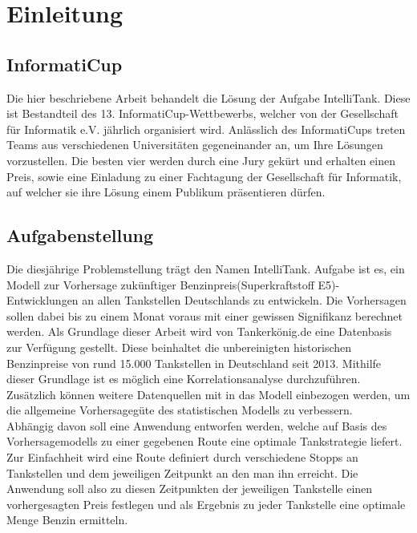 \documentclass[
ngerman          %
,a4paper          %
,11pt
,pdftex
]{report}
\begin{document}




\setcounter{page}{1}


\chapter{Einleitung}

\section{InformatiCup}

Die hier beschriebene Arbeit behandelt die Lösung der Aufgabe IntelliTank. Diese ist Bestandteil des 13. InformatiCup-Wettbewerbs, welcher von der Gesellschaft für Informatik e.V. jährlich organisiert wird.
Anlässlich des InformatiCups treten Teams aus verschiedenen Universitäten gegeneinander an, um Ihre Lösungen vorzustellen. Die besten vier werden durch eine Jury gekürt und erhalten einen Preis, sowie eine Einladung zu einer Fachtagung der Gesellschaft für Informatik, auf welcher sie ihre Lösung einem Publikum präsentieren dürfen.

\section{Aufgabenstellung}

Die diesjährige Problemstellung trägt den Namen IntelliTank. Aufgabe ist es, ein Modell zur Vorhersage zukünftiger Benzinpreis(Superkraftstoff E5)-Entwicklungen an allen Tankstellen Deutschlands zu entwickeln. Die Vorhersagen sollen dabei bis zu einem Monat voraus mit einer gewissen Signifikanz berechnet werden. Als Grundlage dieser Arbeit wird von Tankerkönig.de eine Datenbasis zur Verfügung gestellt. Diese beinhaltet die unbereinigten historischen Benzinpreise von rund 15.000 Tankstellen in Deutschland seit 2013. Mithilfe dieser Grundlage ist es möglich eine Korrelationsanalyse durchzuführen. Zusätzlich können weitere Datenquellen mit in das Modell einbezogen werden, um die allgemeine Vorhersagegüte des statistischen Modells zu verbessern.\\

Abhängig davon soll eine Anwendung entworfen werden, welche auf Basis des Vorhersagemodells zu einer gegebenen Route eine optimale Tankstrategie liefert.
Zur Einfachheit wird eine Route definiert durch verschiedene Stopps an Tankstellen und dem jeweiligen Zeitpunkt an den man ihn erreicht. Die Anwendung soll also zu diesen Zeitpunkten der jeweiligen Tankstelle einen vorhergesagten Preis festlegen und als Ergebnis zu jeder Tankstelle eine optimale Menge Benzin ermitteln.
\end{document}
